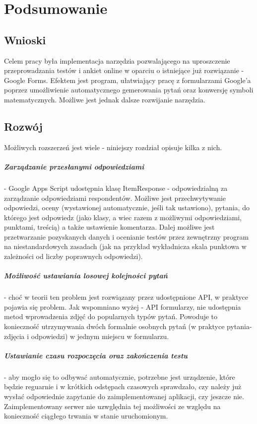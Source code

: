 \chapter{Podsumowanie}%

\section{Wnioski}
Celem pracy była implementacja narzędzia pozwalającego na uproszczenie przeprowadzania testów i ankiet online w oparciu o istniejące już rozwiązanie - Google Forms.  Efektem jest program, ułatwiający pracę z formularzami Google'a poprzez umożliwienie automatycznego gemerowania pytań oraz konwersję symboli matematycznych.  Możliwe jest jednak dalsze rozwijanie narzędzia. 

\section{Rozwój}
Możliwych rozszerzeń jest wiele - niniejszy rozdział opisuje kilka z nich.
\paragraph{Zarządzanie przesłanymi odpowiedziami} - Google Apps Script udostępnia klasę ItemResponse - odpowiedzialną za zarządzanie odpowiedziami respondentów. Możliwe jest przechwytywanie odpowiedzi, oceny (wystawionej automatycznie, jeśli tak ustawiono), pytania, do którego jest odpowiedz (jako klasy, a wiec razem z możliwymi odpowiedziami, punktami, treścią) a także ustawienie komentarza. Dalej możliwe jest przetwarzanie pozyskanych danych i ocenianie testów przez zewnętrzny program na niestandardowych zasadach (jak na przykład wykładnicza skala punktowa w zależności od liczby poprawnych odpowiedzi).
\paragraph{Możliwość ustawiania losowej kolejności pytań} - choć w teorii ten problem jest rozwiązany przez udostępnione API, w praktyce pojawia się problem. Jak wspomniano wyżej - API formularzy, nie udostępnia metod wprowadzenia zdjęć do popularnych typów pytań. Powoduje to konieczność utrzymywania dwóch formalnie osobnych pytań (w praktyce pytania-zdjęcia i odpowiedzi) w jednym miejscu w formularzu.
\paragraph{Ustawianie czasu rozpoczęcia oraz zakończenia testu} - aby mogło się to odbywać automatycznie, potrzebne jest urządzenie, które będzie reguarnie i w krótkich odstępach czasowych sprawdzało, czy należy już wysłać odpowiednie zapytanie do zaimplementowanej aplikacji, czy jeszcze nie. Zaimplementowany serwer nie uzwględnia tej możliwości ze względu na konieczność ciągłego trwania w stanie uruchomionym.


